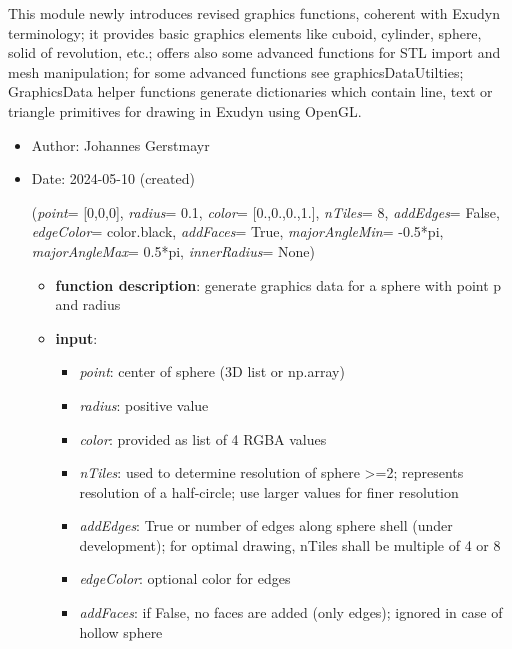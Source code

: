 \begin{itemize}[leftmargin=1.4cm]
\begin{itemize}[leftmargin=1.4cm]
\begin{itemize}[leftmargin=1.4cm]
\begin{itemize}[leftmargin=0.5cm]
\begin{itemize}[leftmargin=1.4cm]
\begin{itemize}[leftmargin=1.4cm]
\begin{itemize}[leftmargin=1.4cm]
\begin{itemize}[leftmargin=0.5cm]
%
\label{sec:module:graphics}
  This module newly introduces revised graphics functions, coherent with Exudyn terminology;
           it provides basic graphics elements like cuboid, cylinder, sphere, solid of revolution, etc.;
           offers also some advanced functions for STL import and mesh manipulation; 
           for some advanced functions see graphicsDataUtilties;
           GraphicsData helper functions generate dictionaries which contain line, text or triangle primitives for drawing in Exudyn using OpenGL.
\begin{itemize}[leftmargin=1.4cm]
\setlength{\itemindent}{-1.4cm}
\item[]Author:    Johannes Gerstmayr
\item[]Date:      2024-05-10 (created)
\ei
\begin{flushleft}
\label{sec:graphics:Sphere}
({\it point}= [0,0,0], {\it radius}= 0.1, {\it color}= [0.,0.,0.,1.], {\it nTiles}= 8, {\it addEdges}= False, {\it edgeColor}= color.black, {\it addFaces}= True, {\it majorAngleMin}= -0.5*pi, {\it majorAngleMax}= 0.5*pi, {\it innerRadius}= None)
\end{flushleft}
\setlength{\itemindent}{0.7cm}
\begin{itemize}[leftmargin=0.7cm]
\item[--]
{\bf function description}: generate graphics data for a sphere with point p and radius
\item[--]
{\bf input}: \vspace{-6pt}
\begin{itemize}[leftmargin=1.2cm]
\setlength{\itemindent}{-0.7cm}
\item[]{\it point}: center of sphere (3D list or np.array)
\item[]{\it radius}: positive value
\item[]{\it color}: provided as list of 4 RGBA values
\item[]{\it nTiles}: used to determine resolution of sphere >=2; represents resolution of a half-circle; use larger values for finer resolution
\item[]{\it addEdges}: True or number of edges along sphere shell (under development); for optimal drawing, nTiles shall be multiple of 4 or 8
\item[]{\it edgeColor}: optional color for edges
\item[]{\it addFaces}: if False, no faces are added (only edges); ignored in case of hollow sphere

\end{itemize}
\end{itemize}
\end{itemize}
\end{itemize}
\end{itemize}
\end{itemize}
\end{itemize}
\end{itemize}
\end{itemize}
\end{itemize}
\end{itemize}
